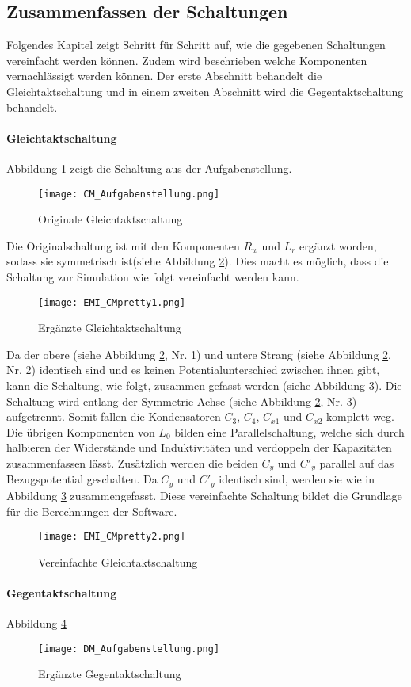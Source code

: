 \subsection{Zusammenfassen der Schaltungen}\label{subsec:zusammenfassungSchaltung}
Folgendes Kapitel zeigt Schritt für Schritt auf, wie die gegebenen Schaltungen vereinfacht werden können. Zudem wird beschrieben welche Komponenten vernachlässigt werden können. Der erste Abschnitt behandelt die Gleichtaktschaltung und in einem zweiten Abschnitt wird die Gegentaktschaltung behandelt.

\paragraph{Gleichtaktschaltung}\label{para:zusammenfassungGleichtakt}
Abbildung \ref{fig:CMSchaltungOriginal} zeigt die Schaltung aus der Aufgabenstellung. 
\begin{figure}[H]
	\centering
	\texttt{[image: CM\_Aufgabenstellung.png]}
	\caption{Originale Gleichtaktschaltung\cite{aufgabenstellung}}
	\label{fig:CMSchaltungOriginal}
\end{figure}
Die Originalschaltung ist mit den Komponenten $R_w$ und $L_r$ ergänzt worden, sodass sie symmetrisch ist(siehe Abbildung \ref{fig:CMSchaltungErgänzt}). Dies macht es möglich, dass die Schaltung zur Simulation wie folgt vereinfacht werden kann.
\begin{figure}[H]
	\centering
	\texttt{[image: EMI\_CMpretty1.png]}
	\caption{Ergänzte Gleichtaktschaltung}
	\label{fig:CMSchaltungErgänzt}
\end{figure}
Da der obere (siehe Abbildung \ref{fig:CMSchaltungErgänzt}, Nr. 1) und untere Strang (siehe Abbildung \ref{fig:CMSchaltungErgänzt}, Nr. 2) identisch sind und es keinen Potentialunterschied zwischen ihnen gibt, kann die Schaltung, wie folgt, zusammen gefasst werden (siehe Abbildung \ref{fig:CMSchaltungvereinfacht}). Die Schaltung wird entlang der Symmetrie-Achse (siehe Abbildung \ref{fig:CMSchaltungErgänzt}, Nr. 3) aufgetrennt. Somit fallen die Kondensatoren $C_3$, $C_4$, $C_{x1}$ und $C_{x2}$ komplett weg. Die übrigen Komponenten von $L_0$ bilden eine Parallelschaltung, welche sich durch halbieren der Widerstände und Induktivitäten und verdoppeln der Kapazitäten zusammenfassen lässt. Zusätzlich werden die beiden $C_y$ und $C'_{y}$ parallel auf das Bezugspotential geschalten. Da $C_y$ und $C'_y$ identisch sind, werden sie wie in Abbildung \ref{fig:CMSchaltungvereinfacht} zusammengefasst. Diese vereinfachte Schaltung bildet die Grundlage für die Berechnungen der Software.
\begin{figure}[H]
	\centering
	\texttt{[image: EMI\_CMpretty2.png]}
	\caption{Vereinfachte Gleichtaktschaltung}
	\label{fig:CMSchaltungvereinfacht}
\end{figure}
\paragraph{Gegentaktschaltung}\label{para:zusammenfassungGegentakt}
Abbildung \ref{fig:DMSchaltungAufgabenstellung}
\begin{figure}[H]
	\centering
	\texttt{[image: DM\_Aufgabenstellung.png]}
	\caption{Ergänzte Gegentaktschaltung}
	\label{fig:DMSchaltungAufgabenstellung}
\end{figure}
